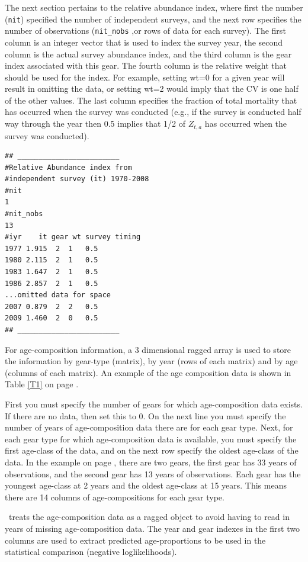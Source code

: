 \begin{multicols}{2}
The next section pertains to the relative abundance index, where first the number (\texttt{nit}) specified the number of independent surveys, and the next row specifies the number of observations (\texttt{nit\_nobs} ,or rows of data for each survey).  The first column is an integer vector that is used to index the survey year, the second column is the actual survey abundance index, and the third column is the gear index associated with this gear.  The fourth column is the relative weight that should be used for the index.  For example, setting wt=0 for a given year will result in omitting the data, or setting wt=2 would imply that the CV is one half of the other values.  The last column specifies the fraction of total mortality that has occurred when the survey was conducted (e.g., if the survey is conducted half way through the year then 0.5 implies that 1/2 of $Z_{t,a}$ has occurred when the survey was conducted).
\begin{verbatim}
## ________________________
#Relative Abundance index from 
#independent survey (it) 1970-2008
#nit
1
#nit_nobs
13
#iyr    it gear wt survey timing
1977 1.915  2  1   0.5
1980 2.115  2  1   0.5
1983 1.647  2  1   0.5
1986 2.857  2  1   0.5
...omitted data for space
2007 0.879  2  2   0.5
2009 1.460  2  0   0.5
## ________________________
\end{verbatim}

For age-composition information, a 3 dimensional ragged array is used to store the information by gear-type (matrix), by year (rows of each matrix) and by age (columns of each matrix).  An example of the age composition data is shown in Table \ref{T1} on page \pageref{T1}.  

First you must specify the number of gears for which age-composition data exists.  If there are no data, then set this to 0. On  the next line you must specify the number of years of age-composition data there are for each gear type.  Next, for each gear type for which age-composition data is available, you must specify the first age-class of the data, and on the next row specify the oldest age-class of the data.  In the example on page \pageref{T1}, there are two gears, the first gear has 33 years of observations, and the second gear has 13 years of observations.  Each gear has the youngest age-class at 2 years and the oldest age-class at 15 years.  This means there are 14 columns of age-compositions for each gear type. 

\iscam\ treats the age-composition data as a ragged object to avoid having to read in years of missing age-composition data.  The year and gear indexes in the first two columns are used to extract predicted age-proportions to be used in the statistical comparison (negative loglikelihoods).


\end{multicols}
